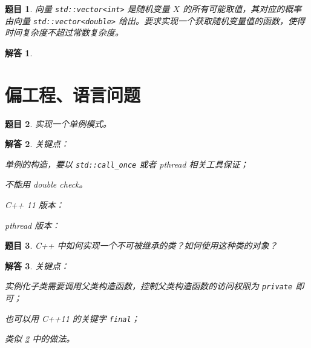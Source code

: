 \documentclass[UTF8, final]{ctexart}
\newtheorem{question}{题目}
\newtheorem{solution}{解答}
\begin{document}
\begin{question}
向量 \lstinline[style = lcpp]|std::vector<int>| 是随机变量 $X$ 的所有可能取值，其对应的概率由向量 \lstinline[style = lcpp]|std::vector<double>| 给出。要求实现一个获取随机变量值的函数，使得时间复杂度不超过常数复杂度。
\end{question}
\begin{solution}

\end{solution}

\section{偏工程、语言问题}
\begin{question}
\label{q:singleton}
实现一个单例模式。
\end{question}
\begin{solution}
关键点：
\begin{compactitem}
    \item 单例的构造，要以 \lstinline[style=lcpp]|std::call_once| 或者 \textsf{pthread} 相关工具保证；
    \item 不能用 double check。
\end{compactitem}
C++ 11 版本：


\textsf{pthread} 版本：

\end{solution}

\begin{question}
C++ 中如何实现一个不可被继承的类？如何使用这种类的对象？
\end{question}
\begin{solution}
关键点：
\begin{compactitem}
    \item 实例化子类需要调用父类构造函数，控制父类构造函数的访问权限为 \lstinline[style=lcpp]|private| 即可；
    \item 也可以用 C++11 的关键字 \lstinline[style=lcpp]|final|；
    \item 类似 \ref{q:singleton} 中的做法。
\end{compactitem}
\end{solution}
\end{document}
